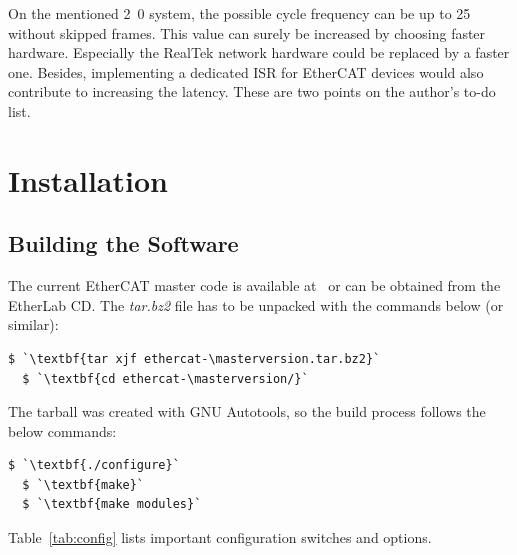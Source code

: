 \documentclass[a4paper,12pt,BCOR6mm,bibtotoc,idxtotoc]{scrbook}
\newcommand{\masterversion}{1.5.0}
\begin{document}
On the mentioned \unit{2.0}{\giga\hertz} system, the possible cycle frequency
can be up to \unit{25}{\kilo\hertz} without skipped frames. This value can
surely be increased by choosing faster hardware. Especially the RealTek network
hardware could be replaced by a faster one. Besides, implementing a dedicated
ISR for EtherCAT devices would also contribute to increasing the latency. These
are two points on the author's to-do list.


\chapter{Installation}
\label{sec:installation}

\section{Building the Software}

The current EtherCAT master code is available at~\cite{etherlab} or can be
obtained from the EtherLab CD. The \textit{tar.bz2} file has to be unpacked
with the commands below (or similar):

\begin{lstlisting}[gobble=2]
  $ `\textbf{tar xjf ethercat-\masterversion.tar.bz2}`
  $ `\textbf{cd ethercat-\masterversion/}`
\end{lstlisting}

The tarball was created with GNU Autotools, so the build process
follows the below commands:

\begin{lstlisting}[gobble=2]
  $ `\textbf{./configure}`
  $ `\textbf{make}`
  $ `\textbf{make modules}`
\end{lstlisting}

Table~\ref{tab:config} lists important configuration switches and options.
\end{document}
